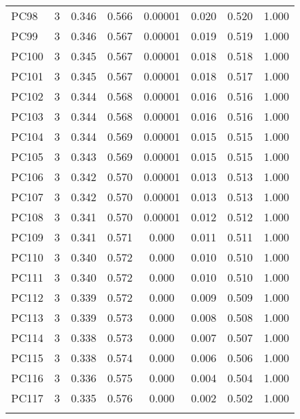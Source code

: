 \begin{table}[!htbp]
\begin{tabular}{@{\extracolsep{5pt}}lccccccc}
PC98 & 3 & 0.346 & 0.566 & 0.00001 & 0.020 & 0.520 & 1.000 \\ 
PC99 & 3 & 0.346 & 0.567 & 0.00001 & 0.019 & 0.519 & 1.000 \\ 
PC100 & 3 & 0.345 & 0.567 & 0.00001 & 0.018 & 0.518 & 1.000 \\ 
PC101 & 3 & 0.345 & 0.567 & 0.00001 & 0.018 & 0.517 & 1.000 \\ 
PC102 & 3 & 0.344 & 0.568 & 0.00001 & 0.016 & 0.516 & 1.000 \\ 
PC103 & 3 & 0.344 & 0.568 & 0.00001 & 0.016 & 0.516 & 1.000 \\ 
PC104 & 3 & 0.344 & 0.569 & 0.00001 & 0.015 & 0.515 & 1.000 \\ 
PC105 & 3 & 0.343 & 0.569 & 0.00001 & 0.015 & 0.515 & 1.000 \\ 
PC106 & 3 & 0.342 & 0.570 & 0.00001 & 0.013 & 0.513 & 1.000 \\ 
PC107 & 3 & 0.342 & 0.570 & 0.00001 & 0.013 & 0.513 & 1.000 \\ 
PC108 & 3 & 0.341 & 0.570 & 0.00001 & 0.012 & 0.512 & 1.000 \\ 
PC109 & 3 & 0.341 & 0.571 & 0.000 & 0.011 & 0.511 & 1.000 \\ 
PC110 & 3 & 0.340 & 0.572 & 0.000 & 0.010 & 0.510 & 1.000 \\ 
PC111 & 3 & 0.340 & 0.572 & 0.000 & 0.010 & 0.510 & 1.000 \\ 
PC112 & 3 & 0.339 & 0.572 & 0.000 & 0.009 & 0.509 & 1.000 \\ 
PC113 & 3 & 0.339 & 0.573 & 0.000 & 0.008 & 0.508 & 1.000 \\ 
PC114 & 3 & 0.338 & 0.573 & 0.000 & 0.007 & 0.507 & 1.000 \\ 
PC115 & 3 & 0.338 & 0.574 & 0.000 & 0.006 & 0.506 & 1.000 \\ 
PC116 & 3 & 0.336 & 0.575 & 0.000 & 0.004 & 0.504 & 1.000 \\ 
PC117 & 3 & 0.335 & 0.576 & 0.000 & 0.002 & 0.502 & 1.000 \\ 
\hline \\[-1.8ex] 
\end{tabular} 
\end{table} 
